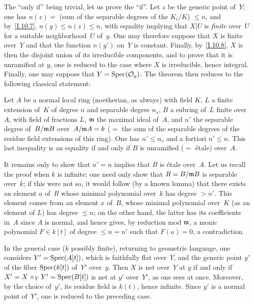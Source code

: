 The ``only if'' being trivial, let us prove the ``if''.
Let $z$ be the generic point of~$Y$; one has $n(z)=$
(sum of the separable degrees of the $K_i/K$) $\le n$,
and by~\ref{I.10.7}, $n(y)\le n(z)\le n$, with equality
implying that $X|U$ is \emph{finite} over~$U$ for a
suitable neighborhood~$U$ of~$y$. One may therefore
suppose that $X$ is finite over~$Y$ and that the
function $n(y')$ on~$Y$ is constant. Finally,
by~\ref{I.10.8}, $X$ is then the disjoint union of
its irreducible components, and to prove that it
is unramified at $y$, one is reduced to the case
where $X$ is irreducible, hence integral. Finally,
one may suppose that $Y=\operatorname{Spec}(\mathcal{O}_y)$. The theorem
then reduces to the following classical statement:

\begin{corollary}
\label{I.10.12}
Let $A$ be a normal local ring (noetherian, as always)
with field $K$, $L$ a finite extension of~$K$ of
degree $n$ and separable degree $n_s$, $B$ a subring
of~$L$ finite over~$A$, with field of fractions $L$,
$\mathfrak{m}$ the maximal ideal of~$A$, and $n'$ the
separable degree of~$B/\mathfrak{m}B$ over~$A/\mathfrak{m}A=k$
($=$ the sum of the separable degrees of the residue
field extensions of this ring). One has $n'\le n_s$
and a fortiori $n'\le n$. This last inequality is
an equality if and only if $B$ is unramified
($=$ \'etale) over~$A$.
\end{corollary}

It remains only to show that $n'=n$ implies that $B$
is \'etale over~$A$. Let us recall the proof when $k$
is infinite: one need only show that $R=B/\mathfrak{m}B$
is separable over~$k$; if this were not so, it would
follow (by a known lemma) that there exists an
element $a$ of~$R$ whose minimal polynomial over~$k$
has degree $>n'$. This element comes from an element
$x$ of~$B$, whose minimal polynomial over~$K$
(as an element of $L$) has degree $\le n$; on the
other hand, the latter has its coefficients in~$A$
since $A$ is normal, and hence gives, by reduction
mod $\mathfrak{m}$, a monic polynomial $F\in k[t]$ of
degree $\le n=n'$ such that $F(a)=0$, a contradiction.

In
the general case ($k$ possibly finite), returning
to geometric language, one considers $Y'=\operatorname{Spec}(A[t])$,
which is faithfully flat over~$Y$, and the generic
point $y'$ of the fiber $\operatorname{Spec}(k[t])$ of~$Y'$ over~$y$.
Then $X$ is net over~$Y$ at $y$ if and only if
$X'=X\times_Y Y'=\operatorname{Spec}(B[t])$ is net at $y'$ over~$Y'$,
as one sees at once. Moreover, by the choice of~$y'$,
its residue field is $k(t)$, hence infinite. Since
$y'$ is a normal point of~$Y'$, one is reduced to
the preceding case.
